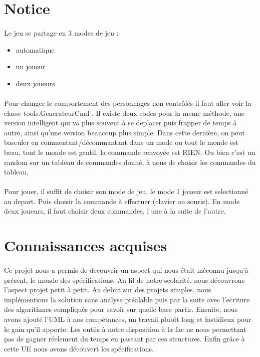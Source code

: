 \documentclass[a4paper,titlepage,openany,12pt]{report}
\begin{document}
\section*{Notice}
\paragraph{}
Le jeu se partage en 3 modes de jeu :
\begin{itemize}
\item automatique
\item un joueur
\item deux joueurs
\end{itemize}

\paragraph{}
Pour changer le comportement des personnages non contrôlés il faut
aller voir la classe tools.GenerateurCmd .
Il existe deux codes pour la meme méthode, une version intelligent qui
va plus souvent à se deplacer puis frapper de temps à autre, ainsi
qu'une version beaucoup plus simple. Dans cette dernière, on peut
basculer en commentant/décommantant dans un mode ou tout le monde est
beau, tout le monde est gentil, la commande renvoyée est RIEN. Ou bien
c'est un random sur un tableau de commandes donné, à nous de choisir
les commandes du tableau.

\paragraph{}
Pour jouer, il suffit de choisir son mode de jeu, le mode 1 joueur est
selectionné au depart. Puis choisir la commande à effectuer (clavier
ou souris).
En mode deux joueurs, il faut choisir deux commandes, l'une à la suite
de l'autre.


\section*{Connaissances acquises}
\paragraph{}
Ce projet nous a permis de decouvrir un aspect qui nous était méconnu
jusqu'à présent, le monde des spécifications.
Au fil de notre scolarité, nous découvrons l'aspect projet petit à
petit.
Au debut sur des projets simples, nous implémentions la solution sans
analyse préalable puis par la suite avec l'ecriture des algorithmes
compliqués pour savoir sur quelle base partir.
Ensuite, nous avons ajouté l'UML à nos compétances, un travail plutôt
long et fastidieux pour le gain qu'il apporte. Les outils à notre
disposition à la fac ne nous permettant pas de gagner réelement du
temps en passant par ces structures.
Enfin grâce à cette UE nous avons découvert les spécifications.
\end{document}
